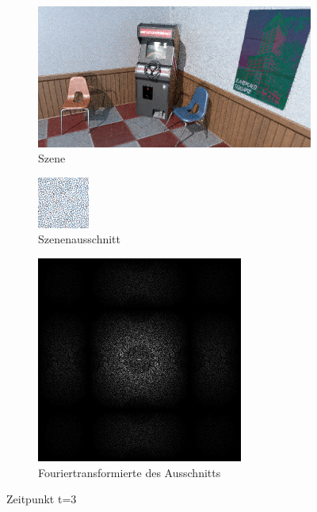 \begin{figure}[H]
    \begin{subfigure}{\textwidth}
        \centering \includegraphics[scale=.25]{content/TemporalerAlg/Bilder/Retargeting/Screenshots/seed_debug_5.0_selection.png}
        \caption{Szene}
        \label{fig:Retargeting_And_Sorting_Szene_t3}
    \end{subfigure}
    \begin{subfigure}{0.5\textwidth}
        \centering\includegraphics[width=0.4\linewidth]{content/TemporalerAlg/Bilder/Retargeting/Screenshots/seed_debug_5.0_ausschnitt.png} 
        \caption{Szenenausschnitt}
        \label{fig:Retargeting_And_Sorting_ausschnitt_t3}
    \end{subfigure}
    \begin{subfigure}{0.5\textwidth}
        \centering\includegraphics[width=0.4\linewidth]{content/TemporalerAlg/Bilder/Retargeting/Screenshots/Spektren/seed_debug_5.0_ausschnitt.png}
        \caption{Fouriertransformierte des Ausschnitts}
        \label{fig:Retargeting_And_Sorting_Fouriertransformierte_t3}
    \end{subfigure}
        \caption{Zeitpunkt t=3}
        \label{fig:Retargeting_And_Sorting_Verlauf_t3}
\end{figure}

